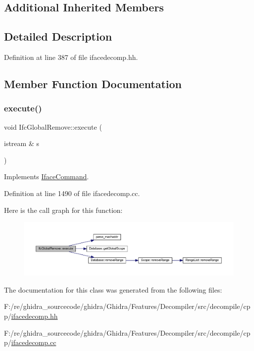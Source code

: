 \subsection*{Additional Inherited Members}


\subsection{Detailed Description}


Definition at line 387 of file ifacedecomp.\+hh.



\subsection{Member Function Documentation}
\mbox{\label{class_ifc_global_remove_acb81449b281ae69ff0dac554beeb0318}} 
\subsubsection{\texorpdfstring{execute()}{execute()}}
{\footnotesize\ttfamily void Ifc\+Global\+Remove\+::execute (\begin{DoxyParamCaption}\item[{istream \&}]{s }\end{DoxyParamCaption})\hspace{0.3cm}{\ttfamily [virtual]}}



Implements \mbox{\hyperlink{class_iface_command_af10e29cee2c8e419de6efe9e680ad201}{Iface\+Command}}.



Definition at line 1490 of file ifacedecomp.\+cc.

Here is the call graph for this function\+:
\nopagebreak
\begin{figure}[H]
\begin{center}
\leavevmode
\includegraphics[width=350pt]{class_ifc_global_remove_acb81449b281ae69ff0dac554beeb0318_cgraph}
\end{center}
\end{figure}


The documentation for this class was generated from the following files\+:\begin{DoxyCompactItemize}
\item 
F\+:/re/ghidra\+\_\+sourcecode/ghidra/\+Ghidra/\+Features/\+Decompiler/src/decompile/cpp/\mbox{\hyperlink{ifacedecomp_8hh}{ifacedecomp.\+hh}}\item 
F\+:/re/ghidra\+\_\+sourcecode/ghidra/\+Ghidra/\+Features/\+Decompiler/src/decompile/cpp/\mbox{\hyperlink{ifacedecomp_8cc}{ifacedecomp.\+cc}}\end{DoxyCompactItemize}
